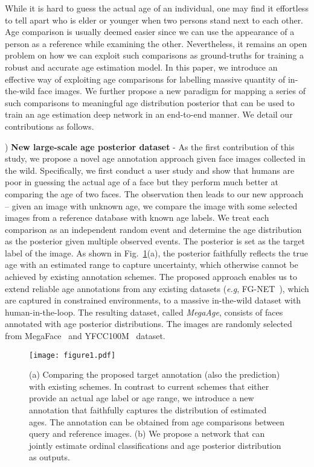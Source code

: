 \documentclass{bmvc2k}
\def\eg{\emph{e.g}\bmvaOneDot}
\begin{document}
While it is hard to guess the actual age of an individual, one may find it effortless to tell apart who is elder or younger when two persons stand next to each other. Age comparison is usually deemed easier since we can use the appearance of a person as a reference while examining the other.  
Nevertheless, it remains an open problem on how we can exploit such comparisons as ground-truths for training a robust and accurate age estimation model.
In this paper, we introduce an effective way of exploiting age comparisons for labelling massive quantity of in-the-wild face images. We further propose a new paradigm for mapping a series of such comparisons to meaningful age distribution posterior that can be used to train an age estimation deep network in an end-to-end manner. We detail our contributions as follows.

) \textbf{New large-scale age posterior dataset} -
As the first contribution of this study, we propose a novel age annotation approach given face images collected in the wild.
Specifically, we first conduct a user study and show that humans are poor in guessing the actual age of a face but they perform much better at comparing the age of two faces.
The observation then leads to our new approach -- given an image with unknown age, we compare the image with some selected images from a reference database with known age labels. We treat each comparison as an independent random event and determine the age distribution as the posterior given multiple observed events. The posterior is set as the target label of the image. As shown in Fig.~\ref{fig:intro}(a), the posterior faithfully reflects the true age with an estimated range to capture uncertainty, which otherwise cannot be achieved by existing annotation schemes.
The proposed approach enables us to extend reliable age annotations from any existing datasets (\eg, FG-NET~\cite{panis2014overview}), which are captured in constrained environments, to a massive in-the-wild dataset with human-in-the-loop. The resulting dataset, called \textit{MegaAge}, consists of  faces annotated with age posterior distributions. The images are randomly selected from MegaFace~\cite{kemelmacher2016megaface} and YFCC100M~\cite{ni2015large} dataset. 

\begin{figure}[t]
\begin{center}
\texttt{[image: figure1.pdf]}
\vskip -0.3cm
\caption{(a) Comparing the proposed target annotation (also the prediction) with existing schemes. In contrast to current schemes that either provide an actual age label or age range, we introduce a new annotation that faithfully captures the distribution of estimated ages. The annotation can be obtained from age comparisons between query and reference images. (b) We propose a network that can jointly estimate ordinal classifications and age posterior distribution as outputs.}
\vspace{-0.4cm}
\label{fig:intro}
\end{center}
\end{figure}
\end{document}
